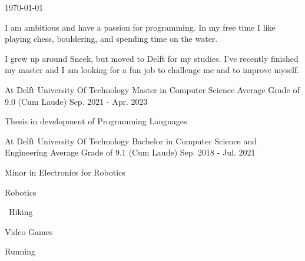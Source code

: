 \documentclass[11pt, a4paper]{awesome-cv}
\begin{document}
\makecvheader

\makecvfooter
  {\today}
  {}
  {}
  
\begin{paracol}{2}
	
	\begin{cvparagraph}
		I am ambitious and have a passion for programming. In my free time I like playing chess, bouldering, and spending time on the water. 
		
		I grew up around Sneek, but moved to Delft for my studies. I've recently finished my master and I am looking for a fun job to challenge me and to improve myself.
	\end{cvparagraph}
	
	
	\begin{cventries}
		\compactcventry
		{At Delft University Of Technology}
		{Master in Computer Science}
		{Average Grade of 9.0 (Cum Laude)}
		{Sep. 2021 - Apr. 2023}
		{\begin{cvitems}
				\item Thesis in development of Programming Languages
		\end{cvitems}}	
		
		\compactcventry
		{At Delft University Of Technology}
		{Bachelor in Computer Science and Engineering}
		{Average Grade of 9.1 (Cum Laude)}
		{Sep. 2018 - Jul. 2021}
		{\begin{cvitems}
				\item Minor in Electronics for Robotics
		\end{cvitems}}	
	\end{cventries}
	

	
	\begin{cvparagraph}
		\begin{description}[leftmargin=*]
			\item[] \faRobot \hspace*{0.1cm} Robotics
			\item[] \faHiking \hspace*{0.15cm} \, Hiking
			\item[] \faGamepad \hspace*{0.1cm} Video Games
			\item[] \faRunning \hspace*{0.20cm} Running
		\end{description}
	\end{cvparagraph}
	

\end{paracol}
\end{document}
